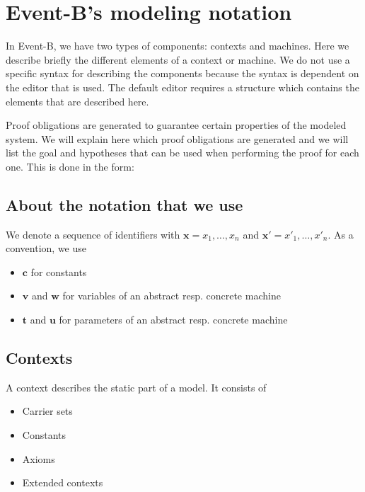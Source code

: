 \newcommand{\varlist}[1]{\mathbf{#1}}
\newcommand{\allconstants}{\varlist{c}}
\newcommand{\absvariables}{\varlist{v}}
\newcommand{\concvariables}{\varlist{w}}
\newcommand{\allvariables}{{\absvariables,\concvariables}}
\newcommand{\absparameters}{\varlist{t}}
\newcommand{\concparameters}{\varlist{u}}
\newcommand{\allparameters}{{\absparameters,\concparameters}}
\newcommand{\absbeforeafter}{\mathcal{S}}
\newcommand{\concbeforeafter}{\mathcal{T}}

\section{Event-B's modeling notation}
\label{reference_02}
\label{proof_obligation}

In Event-B, we have two types of components: contexts and machines.
Here we describe briefly the different elements of a context or machine.
We do not use a specific syntax for describing the components because the syntax is dependent on the editor that is
used. The default editor requires a structure which contains the elements that are described here.

Proof obligations are generated to guarantee certain properties of the modeled system.
We will explain here which proof obligations are generated and we will list the goal and hypotheses that can be used
when performing the proof for each one.
This is done in the form:

\subsection{About the notation that we use}
We denote a sequence of identifiers with $\varlist{x} = x_1,\ldots,x_n$ and $\varlist{x}' = x'_1,\ldots,x'_n$.
As a convention, we use
\begin{itemize}
\item $\allconstants$ for constants
\item $\absvariables$ and $\concvariables$ for variables of an abstract resp. concrete machine
\item $\absparameters$ and $\concparameters$ for parameters of an abstract resp. concrete machine
\end{itemize}

\subsection{Contexts}
A context describes the static part of a model. It consists of
\begin{itemize}
\item Carrier sets
\item Constants
\item Axioms
\item Extended contexts
\end{itemize}

